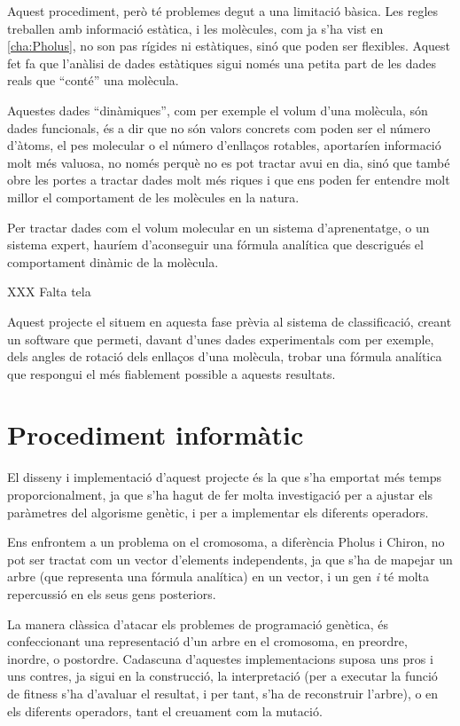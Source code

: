 Aquest procediment, però té problemes degut a una limitació bàsica.  Les regles
treballen amb informació estàtica, i les molècules, com ja s'ha vist en
\ref{cha:Pholus}, no son pas rígides ni estàtiques, sinó que poden ser
flexibles.  Aquest fet fa que l'anàlisi de dades estàtiques sigui només una
petita part de les dades reals que ``conté'' una molècula.

Aquestes dades ``dinàmiques'', com per exemple el volum d'una molècula, són
dades funcionals, és a dir que no són valors concrets com poden 
ser el número d'àtoms, el pes molecular o el número d'enllaços rotables,
aportaríen informació molt més valuosa, no només perquè no es pot tractar avui
en dia, sinó que també obre les portes a tractar dades molt més riques i que ens
poden fer entendre molt millor el comportament de les molècules en la natura.

Per tractar dades com el volum molecular en un sistema d'aprenentatge, o un
sistema expert, hauríem d'aconseguir una fórmula analítica que descrigués el
comportament dinàmic de la molècula.   

XXX Falta tela

Aquest projecte el situem en aquesta fase prèvia al sistema de classificació,
creant un software que permeti, davant d'unes dades experimentals com per
exemple, dels angles de rotació dels enllaços d'una molècula, trobar una fórmula
analítica que respongui el més fiablement possible a aquests resultats.

\section{Procediment informàtic} %
\label{sec:GProcediment informatic}

El disseny i implementació  d'aquest projecte és la que s'ha emportat més temps
proporcionalment, ja que s'ha hagut de fer molta investigació per a ajustar els
paràmetres del algorisme genètic, i per a implementar els diferents operadors.

Ens enfrontem a un problema on el cromosoma, a diferència Pholus i Chiron, no
pot ser tractat com un vector d'elements independents, ja que s'ha de mapejar un
arbre (que representa una fórmula analítica) en un vector, i un gen
\textit{i} té molta repercussió en els seus gens posteriors.

La manera clàssica d'atacar els problemes de programació genètica, és
confeccionant una representació d'un arbre en el cromosoma, en preordre,
inordre, o postordre.  Cadascuna d'aquestes implementacions suposa uns pros i
uns contres, ja sigui en la construcció, la interpretació (per a executar la
funció de fitness s'ha d'avaluar el resultat, i per tant, s'ha de reconstruir
l'arbre), o en els diferents operadors, tant el creuament com la mutació.

